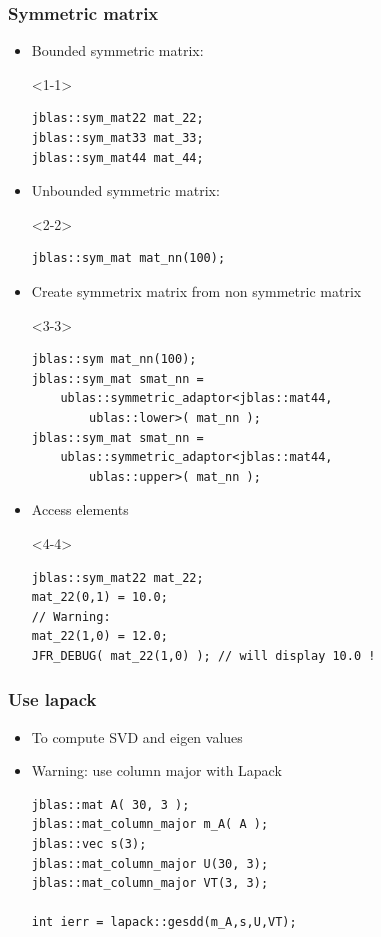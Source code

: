 \documentclass[pdf]{beamer}
\begin{document}

\begin{frame}[fragile]
  \frametitle{Symmetric matrix}
  \begin{itemize}
   \item<1-> Bounded symmetric matrix:
    \begin{onlyenv}<1-1>
      \begin{lstlisting}
jblas::sym_mat22 mat_22;
jblas::sym_mat33 mat_33;
jblas::sym_mat44 mat_44;
      \end{lstlisting}
    \end{onlyenv}
   \item<2-> Unbounded symmetric matrix:
    \begin{onlyenv}<2-2>
      \begin{lstlisting}
jblas::sym_mat mat_nn(100);
      \end{lstlisting}
    \end{onlyenv}
   \item<3-> Create symmetrix matrix from non symmetric matrix
    \begin{onlyenv}<3-3>
      \begin{lstlisting}
jblas::sym mat_nn(100);
jblas::sym_mat smat_nn =
    ublas::symmetric_adaptor<jblas::mat44,
        ublas::lower>( mat_nn );
jblas::sym_mat smat_nn =
    ublas::symmetric_adaptor<jblas::mat44,
        ublas::upper>( mat_nn );
      \end{lstlisting}
    \end{onlyenv}
   \item<4-> Access elements
    \begin{onlyenv}<4-4>
      \begin{lstlisting}
jblas::sym_mat22 mat_22;
mat_22(0,1) = 10.0;
// Warning:
mat_22(1,0) = 12.0;
JFR_DEBUG( mat_22(1,0) ); // will display 10.0 !
      \end{lstlisting}
    \end{onlyenv}
  \end{itemize}

\end{frame}


\begin{frame}[fragile]
  \frametitle{Use lapack}
  \begin{itemize}
   \item<1-> To compute SVD and eigen values
   \item<2-> Warning: use column major with Lapack
      \begin{lstlisting}
jblas::mat A( 30, 3 );
jblas::mat_column_major m_A( A );
jblas::vec s(3);
jblas::mat_column_major U(30, 3);
jblas::mat_column_major VT(3, 3);

int ierr = lapack::gesdd(m_A,s,U,VT);
      \end{lstlisting}
  \end{itemize}
\end{frame}
\end{document}
